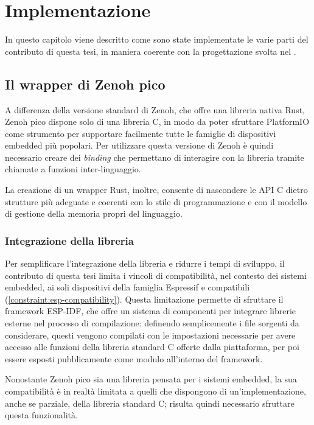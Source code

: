 \chapter{Implementazione}
\label{chap:implementation}

In questo capitolo viene descritto come sono state implementate le varie parti
del contributo di questa tesi, in maniera coerente con la progettazione svolta
nel .

\section{Il wrapper di Zenoh pico}
\label{sec:zenoh-pico-wrapper}

A differenza della versione standard di Zenoh, che offre una libreria nativa Rust,
Zenoh pico dispone solo di una libreria C, in modo da poter sfruttare PlatformIO
come strumento per supportare facilmente tutte le famiglie di dispositivi embedded
più popolari.
Per utilizzare questa versione di Zenoh è quindi necessario creare dei
\emph{binding} che permettano di interagire con la libreria tramite chiamate a
funzioni inter-linguaggio.

La creazione di un wrapper Rust, inoltre, consente di nascondere le \ac{API} C
dietro strutture più adeguate e coerenti con lo stile di programmazione e con il
modello di gestione della memoria propri del linguaggio.

\subsection{Integrazione della libreria}
\label{ssec:zenoh-pico-library-compilation}

Per semplificare l'integrazione della libreria e ridurre i tempi di sviluppo, il
contributo di questa tesi limita i vincoli di compatibilità, nel contesto dei
sistemi embedded, ai soli dispositivi della famiglia Espressif e compatibili
(\ref{constraint:esp-compatibility}).
Questa limitazione permette di sfruttare il framework \ac{ESP-IDF},
che offre un sistema di componenti per integrare librerie esterne nel processo di
compilazione: definendo semplicemente i file sorgenti da considerare, questi vengono
compilati con le impostazioni necessarie per avere accesso alle funzioni della
libreria standard C offerte dalla piattaforma, per poi essere esposti pubblicamente
come modulo all'interno del framework.

Nonostante Zenoh pico sia una libreria pensata per i sistemi embedded, la sua
compatibilità è in realtà limitata a quelli che dispongono di un'implementazione,
anche se parziale, della libreria standard C; risulta quindi necessario sfruttare
questa funzionalità.

